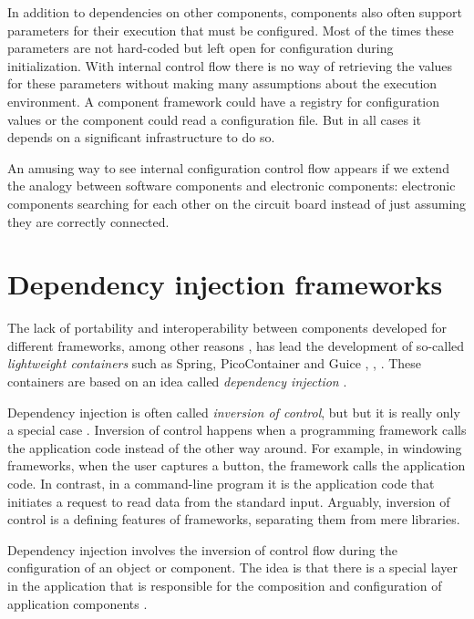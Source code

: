 In addition to dependencies on other components, components also often support parameters for their execution
that must be configured. Most of the times these parameters are not hard-coded but left open for configuration
during initialization. With internal control flow there is no way of retrieving the values for these parameters
without making many assumptions about the execution environment. A component framework could have a registry
for configuration values or the component could read a configuration file. But in all cases it depends on
a significant infrastructure to do so.

An amusing way to see internal configuration control flow appears if we extend the analogy between software components
and electronic components: electronic components searching for each other on the circuit board instead of just assuming
they are correctly connected.

\section{Dependency injection frameworks}

The lack of portability and interoperability between components developed for different frameworks, among other reasons \cite{Dearle},
has lead the development of so-called \emph{lightweight containers} such as Spring, PicoContainer and Guice \cite{Spring},
\cite{PicoContainer}, \cite{Guice}. These containers are based on an idea called \emph{dependency injection} \cite{Fowler2}.

Dependency injection is often called \emph{inversion of control}, but but it is really only a special case \cite{Fowler1}.
Inversion of control happens when a programming framework calls the application code instead of the other way around.
For example, in windowing frameworks, when the user captures a button, the framework calls the application code.
In contrast, in a command-line program it is the application code that initiates a request to read data from the standard input.
Arguably, inversion of control is a defining features of frameworks, separating them from mere libraries.

Dependency injection involves the inversion of control flow during the configuration of an object or component.
The idea is that there is a special layer in the application that is responsible for the composition and configuration
of application components \cite{Sobernig}.

